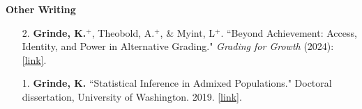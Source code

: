 \documentclass[margin]{res}
\newcommand{\annotateItem}[1]{
	\begin{itemize} \vspace{-0.1cm}
	\item[] 
	\begin{footnotesize}\textcolor{black}{(#1)}\end{footnotesize}
	\end{itemize} \vspace{-0.1cm}
}
\begin{document}
\begin{resume}
\textbf{Other Writing}
\begin{itemize}
\item[2.] \textbf{Grinde, K.}$^{+}$, Theobold,  A.$^{+}$, \& Myint,  L$^{+}$. ``Beyond Achievement: Access, Identity, and Power in Alternative Grading." \textit{Grading for Growth} (2024): \href{https://gradingforgrowth.com/p/beyond-achievement?r=2ny4pq&utm_campaign=post&utm_medium=web}{[link]}.
	
\item[1.] \textbf{Grinde, K. }``Statistical Inference in Admixed Populations." Doctoral dissertation, University of Washington.  2019. \href{https://digital.lib.washington.edu/researchworks/handle/1773/44730?show=full}{[link]}.\\
\end{itemize}



\end{resume}
\end{document}
